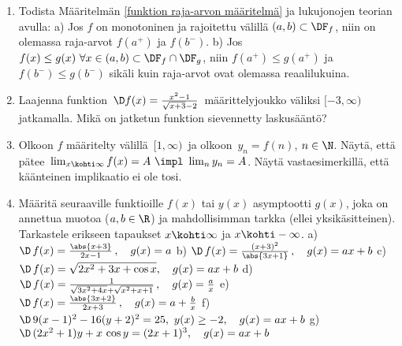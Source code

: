 \begin{enumerate}
\item \label{H-V-2: väittämiä}
Todista Määritelmän \ref{funktion raja-arvon määritelmä} ja lukujonojen teorian
avulla: \vspace{1mm}\newline
a) Jos $f$ on monotoninen ja rajoitettu välillä $(a,b)\subset\DF_f$, niin on olemassa
raja-arvot $f(a^+)$ ja $f(b^-)$. \newline
b) Jos $f(x) \le g(x)\ \forall x\in(a,b)\subset\DF_f\cap\DF_g$, niin $f(a^+) \le g(a^+)$ ja
$f(b^-) \le g(b^-)$ sikäli kuin raja-arvot ovat olemassa reaalilukuina.

\item
Laajenna funktion $\,\D f(x)=\frac{x^2-1}{\sqrt{x+3}-2}\,$
määrittelyjoukko väliksi $[-3,\infty)$ jatkamalla. Mikä on jatketun funktion sievennetty
laskusääntö?

\item
Olkoon $f$ määritelty välillä $\,[1,\infty)\,$ ja olkoon $\,y_n=f(n)$, $n\in\N$. Näytä, että
pätee $\,\lim_{x\kohti\infty} f(x)=A\ \impl\ \lim_ny_n=A$. Näytä vastaesimerkillä, että
käänteinen implikaatio ei ole tosi.

\item
Määritä seuraaville funktioille $f(x)$ tai $y(x)$ asymptootti $g(x)$, joka on annettua
muotoa ($a,b\in\R$) ja mahdollisimman tarkka (ellei yksikäsitteinen). Tarkastele erikseen
tapaukset $x\kohti\infty$ ja $x \kohti -\infty$. \vspace{2mm}\newline
a) $\D \,f(x)=\frac{\abs{x+3}}{2x-1}\,, \quad g(x)=a$ \newline
b) $\D \,f(x)=\frac{(x+3)^2}{\abs{3x+1}}\,, \quad g(x)=ax+b$ \vspace{1mm}\newline
c) $\D \,f(x)=\sqrt{2x^2+3x+\cos x}, \quad g(x)=ax+b$ \vspace{3mm}\newline
d) $\D \,f(x)=\frac{1}{\sqrt{3x^2+4x}+\sqrt{x^2+x+1}}\,, \quad g(x)=\frac{a}{x}$ 
                                                         \vspace{1mm}\newline
e) $\D \,f(x)=\frac{\abs{3x+2}}{2x+3}\,, \quad g(x)=a+\frac{b}{x}$ \vspace{2mm}\newline
f) $\D \,9(x-1)^2-16(y+2)^2=25,\ y(x) \ge -2, \quad g(x)=ax+b$ \vspace{3mm}\newline
g) $\D \,(2x^2+1)y+x\,\cos y=(2x+1)^3, \quad g(x)=ax+b$


\end{enumerate}
